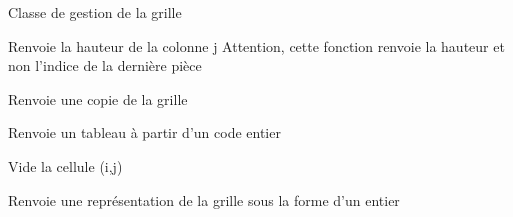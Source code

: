\documentclass[letterpaper,10pt,french]{sphinxmanual}
\begin{document}
\begin{fulllineitems}
\label{\detokenize{index:board.Board}}
Classe de gestion de la grille

\begin{fulllineitems}
\label{\detokenize{index:board.Board.columnHeight}}
Renvoie la hauteur de la colonne j 
Attention, cette fonction renvoie la hauteur et non l’indice de la dernière pièce

\end{fulllineitems}


\begin{fulllineitems}
\label{\detokenize{index:board.Board.copy}}
Renvoie une copie de la grille

\end{fulllineitems}


\begin{fulllineitems}
\label{\detokenize{index:board.Board.decodeFromInt}}
Renvoie un tableau à partir d’un code entier

\end{fulllineitems}


\begin{fulllineitems}
\label{\detokenize{index:board.Board.emptyCell}}
Vide la cellule (i,j)

\end{fulllineitems}


\begin{fulllineitems}
\label{\detokenize{index:board.Board.encodeToInt}}
Renvoie une représentation de la grille sous la forme d’un entier

\end{fulllineitems}


\end{fulllineitems}
\end{document}
